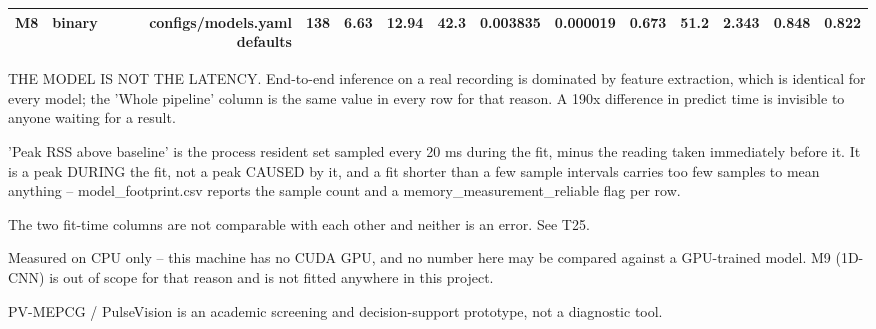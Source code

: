 \begin{table}[htbp]
\begin{tabular}{lrrrrrrrrrrrrr}
    M8 & binary & configs/models.yaml defaults & 138 & 6.63 & 12.94 & 42.3 & 0.003835 & 0.000019 & 0.673 & 51.2 & 2.343 & 0.848 & 0.822 \\
    \bottomrule
  \end{tabular}
  \par\footnotesize THE MODEL IS NOT THE LATENCY. End-to-end inference on a real recording is dominated by feature extraction, which is identical for every model; the 'Whole pipeline' column is the same value in every row for that reason. A 190x difference in predict time is invisible to anyone waiting for a result.
  \par\footnotesize 'Peak RSS above baseline' is the process resident set sampled every 20 ms during the fit, minus the reading taken immediately before it. It is a peak DURING the fit, not a peak CAUSED by it, and a fit shorter than a few sample intervals carries too few samples to mean anything -- model\_footprint.csv reports the sample count and a memory\_measurement\_reliable flag per row.
  \par\footnotesize The two fit-time columns are not comparable with each other and neither is an error. See T25.
  \par\footnotesize Measured on CPU only -- this machine has no CUDA GPU, and no number here may be compared against a GPU-trained model. M9 (1D-CNN) is out of scope for that reason and is not fitted anywhere in this project.
  \par\footnotesize PV-MEPCG / PulseVision is an academic screening and decision-support prototype, not a diagnostic tool.
\end{table}

